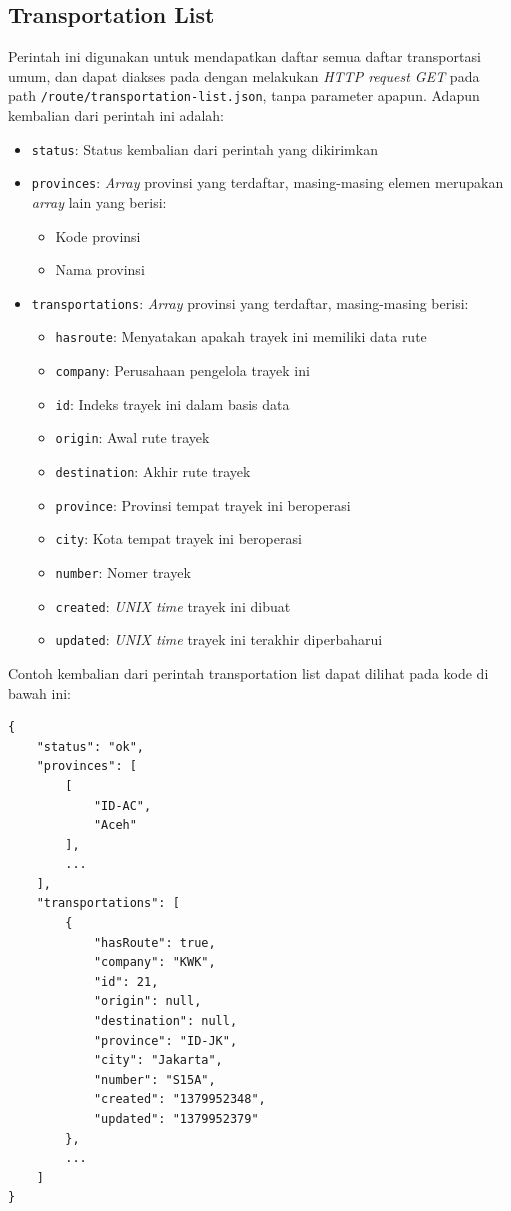 \subsection{Transportation List}
Perintah ini digunakan untuk mendapatkan daftar semua daftar transportasi umum, dan dapat diakses pada dengan melakukan \textit{HTTP request GET} pada path \texttt{/route/transportation-list.json}, tanpa parameter apapun. Adapun kembalian dari perintah ini adalah:

\begin{itemize}
	\item \texttt{status}: Status kembalian dari perintah yang dikirimkan
	\item \texttt{provinces}: \textit{Array} provinsi yang terdaftar, masing-masing elemen merupakan \textit{array} lain yang berisi:
		\begin{itemize}
			\item Kode provinsi
			\item Nama provinsi
		\end{itemize}
	\item \texttt{transportations}: \textit{Array} provinsi yang terdaftar, masing-masing berisi:
		\begin{itemize}
			\item \texttt{hasroute}: Menyatakan apakah trayek ini memiliki data rute
			\item \texttt{company}: Perusahaan pengelola trayek ini
			\item \texttt{id}: Indeks trayek ini dalam basis data
			\item \texttt{origin}: Awal rute trayek
			\item \texttt{destination}: Akhir rute trayek
			\item \texttt{province}: Provinsi tempat trayek ini beroperasi
			\item \texttt{city}: Kota tempat trayek ini beroperasi
			\item \texttt{number}: Nomer trayek
			\item \texttt{created}: \textit{UNIX time} trayek ini dibuat
			\item \texttt{updated}: \textit{UNIX time} trayek ini terakhir diperbaharui
		\end{itemize}
\end{itemize}

Contoh kembalian dari perintah transportation list dapat dilihat pada kode di bawah ini:

\begin{lstlisting}
{
	"status": "ok",
	"provinces": [
		[
			"ID-AC",
			"Aceh"
		],
		...
	],
	"transportations": [
		{
			"hasRoute": true,
			"company": "KWK",
			"id": 21,
			"origin": null,
			"destination": null,
			"province": "ID-JK",
			"city": "Jakarta",
			"number": "S15A",
			"created": "1379952348",
			"updated": "1379952379"
		},
		...
	]
}
\end{lstlisting}

